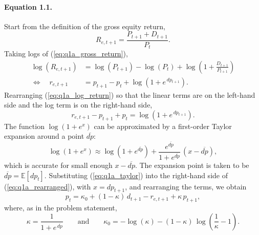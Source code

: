 \documentclass[11pt]{article}
\newcommand{\E}{\mathbb{E}}
\newcommand{\dpr}{\mathit{dp}}   %
\begin{document}
\paragraph{Equation 1.1.}
Start from the definition of the gross equity return,
\begin{equation}
  R_{e,t+1} = \frac{P_{t+1} + D_{t+1}}{P_t}.
  \label{eq:q1a_gross_return}
\end{equation}
Taking logs of (\ref{eq:q1a_gross_return}),
\begin{align}
  \log(R_{e,t+1})
    &= \log(P_{t+1}) - \log(P_t) + \log\!\left(1 + \frac{D_{t+1}}{P_{t+1}}\right) \nonumber \\
  \Longleftrightarrow \quad
  r_{e,t+1}
    &= p_{t+1} - p_t + \log\!\left(1 + e^{\,\dpr_{t+1}}\right).
  \label{eq:q1a_log_return}
\end{align}
Rearranging (\ref{eq:q1a_log_return}) so that the linear terms are on the left-hand side
and the log term is on the right-hand side,
\begin{equation}
  r_{e,t+1} - p_{t+1} + p_t = \log\!\left(1 + e^{\,\dpr_{t+1}}\right).
  \label{eq:q1a_rearranged}
\end{equation}
The function $\log(1 + e^{x})$ can be approximated by a first-order Taylor expansion around
a point $\overline{\dpr}$:
\begin{equation}
  \log\!\left(1 + e^{x}\right)
    \approx \log\!\left(1 + e^{\overline{\dpr}}\right)
      + \frac{e^{\overline{\dpr}}}{1 + e^{\overline{\dpr}}}\,\left(x - \overline{\dpr}\right),
  \label{eq:q1a_taylor}
\end{equation}
which is accurate for small enough $x - \overline{\dpr}$. The expansion point is taken to be
$\overline{\dpr} = \E[\dpr_t]$.
Substituting (\ref{eq:q1a_taylor}) into the right-hand side of (\ref{eq:q1a_rearranged}),
with $x = \dpr_{t+1}$, and rearranging the terms, we obtain
\begin{equation}
  p_t = \kappa_0 + (1 - \kappa)\,d_{t+1} - r_{e,t+1} + \kappa\, p_{t+1},
  \label{eq:q1a_price_recursion}
\end{equation}
where, as in the problem statement,
\begin{equation}
  \kappa = \frac{1}{1 + e^{\,\overline{\dpr}}}
  \qquad \text{and} \qquad
  \kappa_0 = -\log(\kappa) - (1 - \kappa)\,\log\!\left(\frac{1}{\kappa} - 1\right).
  \label{eq:q1a_kappa_def}
\end{equation}
\end{document}
